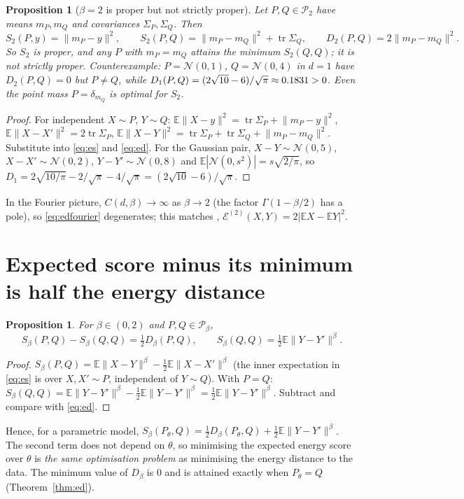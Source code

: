 \documentclass[11pt]{article}
\newtheorem{proposition}[theorem]{Proposition}
\theoremstyle{definition}
\theoremstyle{remark}
\newcommand{\E}{\mathbb{E}}
\newcommand{\Pb}{\mathcal{P}}
\newcommand{\N}{\mathcal{N}}
\newcommand{\norm}[1]{\lVert #1\rVert}
\newcommand{\Sb}{S_\beta}
\newcommand{\Db}{D_\beta}
\begin{document}
\begin{proposition}[$\beta=2$ is proper but not strictly proper]\label{prop:beta2}
Let $P,Q\in\Pb_2$ have means $m_P,m_Q$ and covariances $\Sigma_P,\Sigma_Q$. Then
\[
S_2(P,y)=\norm{m_P-y}^2,\qquad S_2(P,Q)=\norm{m_P-m_Q}^2+\operatorname{tr}\Sigma_Q,\qquad D_2(P,Q)=2\norm{m_P-m_Q}^2 .
\]
So $S_2$ is proper, and any $P$ with $m_P=m_Q$ attains the minimum $S_2(Q,Q)$; it is not strictly proper.
\emph{Counterexample:} $P=\N(0,1)$, $Q=\N(0,4)$ in $d=1$ have $D_2(P,Q)=0$ but $P\neq Q$, while
$D_1(P,Q)=(2\sqrt{10}-6)/\sqrt\pi\approx0.1831>0$. Even the point mass $P=\delta_{m_Q}$ is optimal
for $S_2$.
\end{proposition}
\begin{proof}
For independent $X\sim P$, $Y\sim Q$: $\E\norm{X-y}^2=\operatorname{tr}\Sigma_P+\norm{m_P-y}^2$,
$\E\norm{X-X'}^2=2\operatorname{tr}\Sigma_P$, $\E\norm{X-Y}^2=\operatorname{tr}\Sigma_P+\operatorname{tr}\Sigma_Q+\norm{m_P-m_Q}^2$.
Substitute into \eqref{eq:es} and \eqref{eq:ed}. For the Gaussian pair, $X-Y\sim\N(0,5)$, $X-X'\sim\N(0,2)$,
$Y-Y'\sim\N(0,8)$ and $\E|\N(0,s^2)|=s\sqrt{2/\pi}$, so
$D_1=2\sqrt{10/\pi}-2/\sqrt\pi-4/\sqrt\pi=(2\sqrt{10}-6)/\sqrt\pi$.
\end{proof}
In the Fourier picture, $C(d,\beta)\to\infty$ as $\beta\to2$ (the factor $\Gamma(1-\beta/2)$ has a pole), so
\eqref{eq:edfourier} degenerates; this matches \cite[Prop.~2(ii)]{SR2013}, $\mathcal E^{(2)}(X,Y)=2|\E X-\E Y|^2$.

\section{Expected score minus its minimum is half the energy distance}\label{sec:half}
\begin{proposition}\label{prop:half}
For $\beta\in(0,2)$ and $P,Q\in\Pb_\beta$,
\[
\Sb(P,Q)-\Sb(Q,Q)=\tfrac12\Db(P,Q),\qquad \Sb(Q,Q)=\tfrac12\E\norm{Y-Y'}^\beta .
\]
\end{proposition}
\begin{proof}
$\Sb(P,Q)=\E\norm{X-Y}^\beta-\tfrac12\E\norm{X-X'}^\beta$ (the inner expectation in \eqref{eq:es} is over
$X,X'\sim P$, independent of $Y\sim Q$). With $P=Q$:
$\Sb(Q,Q)=\E\norm{Y-Y'}^\beta-\tfrac12\E\norm{Y-Y'}^\beta=\tfrac12\E\norm{Y-Y'}^\beta$. Subtract and compare with
\eqref{eq:ed}.
\end{proof}
Hence, for a parametric model, $\Sb(P_\theta,Q)=\tfrac12\Db(P_\theta,Q)+\tfrac12\E\norm{Y-Y'}^\beta$. The
second term does not depend on $\theta$, so minimising the expected energy score over $\theta$ is
\emph{the same optimisation problem} as minimising the energy distance to the data. The minimum value of
$\Db$ is $0$ and is attained exactly when $P_\theta=Q$ (Theorem~\ref{thm:ed}).
\end{document}
